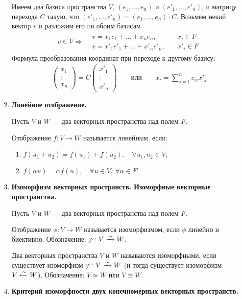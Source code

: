 \begin{enumerate}
Имеем два базиса пространства $V$, $(e_1, \ldots, e_n)$ и $(e'_1, \ldots, e'_n)$, и матрицу перехода $C$ такую, что $(e'_1, \ldots, e'_n) = (e_1, \ldots, e_n) \cdot C$. Возьмем некий вектор $v$ и разложим его по обоим базисам.
\begin{gather*}
v \in V \Rightarrow 
\begin{aligned}
& v = x_1e_1 + \ldots + x_ne_n, \quad & x_i \in F \\
& v = x'_1e'_1 + \ldots + x'_ne'_n, \quad & x'_i \in F
\end{aligned}
\end{gather*}
Формула преобразования координат при переходе к другому базису:
\begin{gather*}
\begin{pmatrix*}
x_1 \\
\vdots \\
x_n
\end{pmatrix*}
= C 
\begin{pmatrix*}
x'_1 \\
\vdots \\
x'_n
\end{pmatrix*}
\qquad \text{или} \qquad
x_i = \sum_{j = 1}^{n}c_{ij}x'_j
\end{gather*}
\item \textbf{Линейное отображение.}

Пусть $V$ и $W$ --- два векторных пространства над полем $F$.

Отображение $f : V \rightarrow W$ называется линейным, если:
\begin{enumerate}
\item $f(u_1 + u_2) = f(u_1) + f(u_2), \quad \forall u_1, u_2 \in V$;
\item $f(\alpha u) = \alpha f(u), \quad \forall u \in V,\ \forall \alpha \in F$.
\end{enumerate}
\item \textbf{Изоморфизм векторных пространств. Изоморфные векторные пространства.}

Пусть $V$ и $W$ --- два векторных пространства над полем $F$.

Отображение $\phi: V \rightarrow W$ называется изоморфизмом, если $\phi$ линейно и биективно. Обозначение: $\varphi : V \xrightarrow{\sim}  W$.

Два векторных пространства $V$ и $W$ называются изоморфными, если существует изоморфизм $\varphi: V \xrightarrow{\sim} W$ (и тогда существует изоморфизм $V \xleftarrow{\sim} W$). Обозначение: $V \simeq W$ или $V \cong W$.
\item \textbf{Критерий изоморфности двух конечномерных векторных пространств.}


\end{enumerate}
